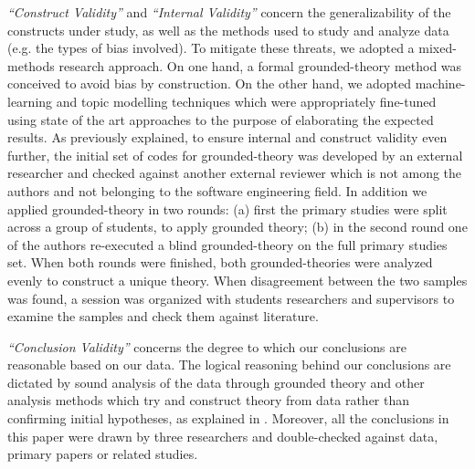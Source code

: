 
\emph{``Construct Validity''} and \emph{``Internal Validity''} concern the generalizability of the constructs under study, as well as the methods used to study and analyze data (e.g. the types of bias involved). To mitigate these threats, we adopted a mixed-methods research approach. On one hand, a formal grounded-theory method was conceived to avoid bias by construction\cite{straussian,gt,gtmeth}. On the other hand, we adopted machine-learning and topic modelling techniques which were appropriately fine-tuned using state of the art approaches to the purpose of elaborating the expected results. As previously explained, to ensure internal and construct validity even further, the initial set of codes for grounded-theory was developed by an external researcher and checked against another external reviewer which is not among the authors and not belonging to the software engineering field. In addition we applied grounded-theory in two rounds: (a) first the primary studies were split across a group of students, to apply grounded theory; (b) in the second round one of the authors re-executed a blind grounded-theory on the full primary studies set. When both rounds were finished, both grounded-theories were analyzed evenly to construct a unique theory. When disagreement between the two samples was found, a session was organized with students researchers and supervisors to examine the samples and check them against literature.


\emph{``Conclusion Validity''} concerns the degree to which our conclusions are reasonable based on our data. The logical reasoning behind our conclusions are dictated by sound analysis of the data through grounded theory and other analysis methods which try and construct theory from data rather than confirming initial hypotheses, as explained in \cite{gtmeth,gtval}. Moreover, all the conclusions in this paper were drawn by three researchers and double-checked against data, primary papers or related studies. 